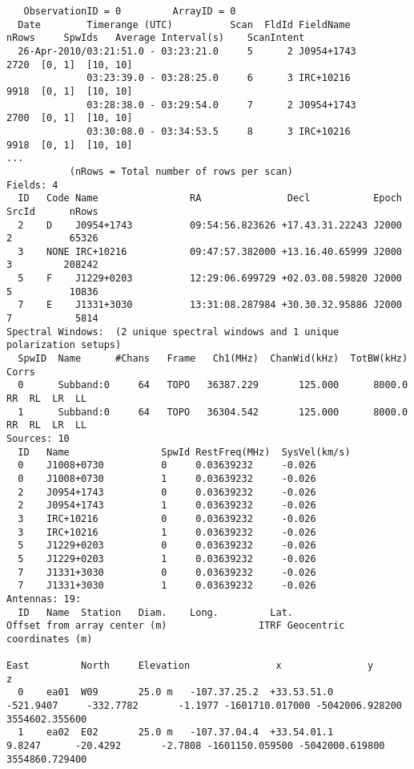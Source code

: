 \begin{verbatim}
   ObservationID = 0         ArrayID = 0
  Date        Timerange (UTC)          Scan  FldId FieldName             nRows     SpwIds   Average Interval(s)    ScanIntent
  26-Apr-2010/03:21:51.0 - 03:23:21.0     5      2 J0954+1743                2720  [0, 1]  [10, 10] 
              03:23:39.0 - 03:28:25.0     6      3 IRC+10216                 9918  [0, 1]  [10, 10] 
              03:28:38.0 - 03:29:54.0     7      2 J0954+1743                2700  [0, 1]  [10, 10] 
              03:30:08.0 - 03:34:53.5     8      3 IRC+10216                 9918  [0, 1]  [10, 10] 
...
           (nRows = Total number of rows per scan) 
Fields: 4
  ID   Code Name                RA               Decl           Epoch   SrcId      nRows
  2    D    J0954+1743          09:54:56.823626 +17.43.31.22243 J2000   2          65326
  3    NONE IRC+10216           09:47:57.382000 +13.16.40.65999 J2000   3         208242
  5    F    J1229+0203          12:29:06.699729 +02.03.08.59820 J2000   5          10836
  7    E    J1331+3030          13:31:08.287984 +30.30.32.95886 J2000   7           5814
Spectral Windows:  (2 unique spectral windows and 1 unique polarization setups)
  SpwID  Name      #Chans   Frame   Ch1(MHz)  ChanWid(kHz)  TotBW(kHz)  Corrs          
  0      Subband:0     64   TOPO   36387.229       125.000      8000.0  RR  RL  LR  LL
  1      Subband:0     64   TOPO   36304.542       125.000      8000.0  RR  RL  LR  LL
Sources: 10
  ID   Name                SpwId RestFreq(MHz)  SysVel(km/s) 
  0    J1008+0730          0     0.03639232     -0.026       
  0    J1008+0730          1     0.03639232     -0.026       
  2    J0954+1743          0     0.03639232     -0.026       
  2    J0954+1743          1     0.03639232     -0.026       
  3    IRC+10216           0     0.03639232     -0.026       
  3    IRC+10216           1     0.03639232     -0.026       
  5    J1229+0203          0     0.03639232     -0.026       
  5    J1229+0203          1     0.03639232     -0.026       
  7    J1331+3030          0     0.03639232     -0.026       
  7    J1331+3030          1     0.03639232     -0.026       
Antennas: 19:
  ID   Name  Station   Diam.    Long.         Lat.                Offset from array center (m)                ITRF Geocentric coordinates (m)        
                                                                     East         North     Elevation               x               y               z
  0    ea01  W09       25.0 m   -107.37.25.2  +33.53.51.0       -521.9407     -332.7782       -1.1977 -1601710.017000 -5042006.928200  3554602.355600
  1    ea02  E02       25.0 m   -107.37.04.4  +33.54.01.1          9.8247      -20.4292       -2.7808 -1601150.059500 -5042000.619800  3554860.729400

\end{verbatim}
